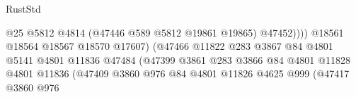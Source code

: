 \begin{lexlean}{RustStd}
\begin{coremodule}
                                                                @25
                                                                @5812
                                                                @4814
                                                                (@47446 @589 @5812 @19861 @19865)
                                                                @47452))))
                                                        @18561
                                                        @18564
                                                        @18567
                                                        @18570
                                                        @17607)
                                                      (@47466
                                                        @11822
                                                        @283
                                                        @3867
                                                        @84
                                                        @4801
                                                        @5141
                                                        @4801
                                                        @11836
                                                        @47484
                                                        (@47399
                                                          @3861
                                                          @283
                                                          @3866
                                                          @84
                                                          @4801
                                                          @11828
                                                          @4801
                                                          @11836
                                                          (@47409
                                                            @3860
                                                            @976
                                                            @84
                                                            @4801
                                                            @11826
                                                            @4625
                                                            @999
                                                            (@47417
                                                              @3860
                                                              @976

\end{coremodule}
\end{lexlean}
